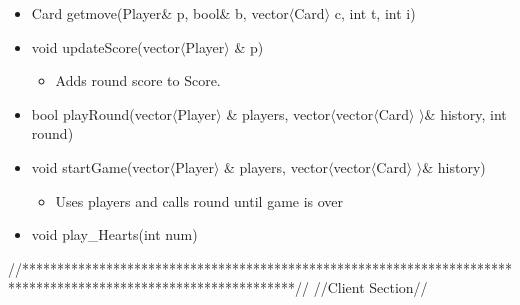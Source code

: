 \documentclass[]{scrartcl}
\begin{document}
\begin{itemize}
 	\item Card getmove(Player\& p, bool\& b, vector$\langle$Card$\rangle$  c, int t, int i)
 	\item void updateScore(vector$\langle$Player$\rangle$ \& p)
 		\begin{itemize}
 			\item Adds round score to Score.
 		\end{itemize}
 	\item bool playRound(vector$\langle$Player$\rangle$ \& players, vector$\langle$vector$\langle$Card$\rangle$ $\rangle$\& history, int round)
 	\item void startGame(vector$\langle$Player$\rangle$ \& players, vector$\langle$vector$\langle$Card$\rangle$ $\rangle$\& history)
 		\begin{itemize}
 			\item  Uses players and calls round until game is over
 		\end{itemize}
 	\item void play\_Hearts(int num)

 \end{itemize}

 //***************************************************************************************************************//
 //Client Section//
\end{document}
